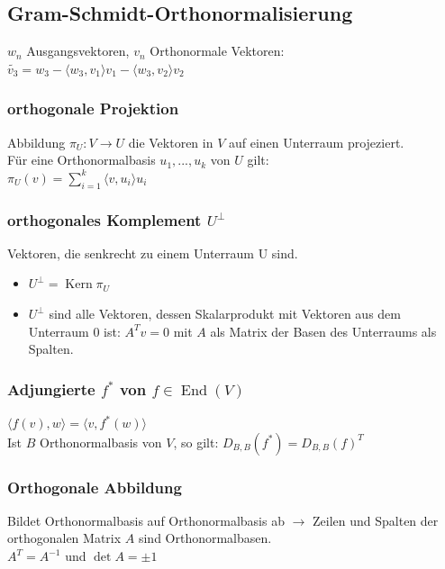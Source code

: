 \documentclass[german, fourcolumn, 8pt]{latex4ei/latex4ei_sheet}
\DeclareMathOperator{\Kern}{Kern}
\DeclareMathOperator{\End}{End}
\begin{document}
\begin{sectionbox}
    \subsection{Gram-Schmidt-Orthonormalisierung}
    $w_n$ Ausgangsvektoren, $v_n$ Orthonormale Vektoren:\\
    $\tilde{v_3}=w_3 - \langle w_3,v_1 \rangle v_1 - \langle w_3,v_2 \rangle v_2$

    \subsubsection{orthogonale Projektion}
    Abbildung $\pi_U : V \rightarrow U$ die Vektoren in $V$ auf einen Unterraum projeziert.\\
    Für eine Orthonormalbasis $u_1, ..., u_k$ von $U$ gilt: \\
    $\pi_U(v)=\sum_{i=1}^{k}\langle v,u_i \rangle u_i$

    \subsubsection{orthogonales Komplement $U^\perp$}
    Vektoren, die senkrecht zu einem Unterraum U sind.
    \begin{itemize}
        \item $U^\perp=\Kern \pi_U$
        \item $U^\perp$ sind alle Vektoren, dessen Skalarprodukt mit Vektoren aus dem Unterraum $0$ ist: $A^Tv=0$ mit $A$ als Matrix der Basen des Unterraums als Spalten.
    \end{itemize}

    \subsubsection{Adjungierte $f^*$ von $f \in \End(V)$}
    $\langle f(v), w \rangle = \langle v, f^*(w) \rangle $\\
    Ist $B$ Orthonormalbasis von $V$, so gilt: $D_{B,B}(f^*)=D_{B,B}(f)^T$

    \subsubsection{Orthogonale Abbildung}
    Bildet Orthonormalbasis auf Orthonormalbasis ab $\rightarrow$ Zeilen und Spalten der orthogonalen Matrix $A$ sind Orthonormalbasen.\\
    $A^T=A^{-1}$ und $\det A = \pm 1$
\end{sectionbox}
\end{document}
